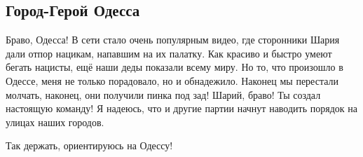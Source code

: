  
 
 

\subsection{Город-Герой Одесса}
\label{sec:24_10_2020.fb.alex_belyy.1.odessa_nazis}


Браво, Одесса!  В сети стало очень популярным видео, где сторонники Шария дали
отпор нацикам, напавшим на их палатку. Как красиво и быстро умеют бегать
нацисты, ещё наши деды показали всему миру. Но то, что произошло в Одессе, меня
не только порадовало, но и обнадежило. Наконец мы перестали молчать, наконец,
они получили пинка под зад! Шарий, браво! Ты создал настоящую команду! Я
надеюсь, что и другие партии начнут наводить порядок на улицах наших городов.

Так держать, ориентируюсь на Одессу!


